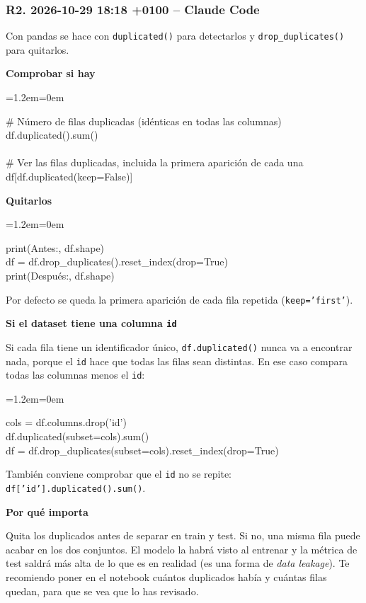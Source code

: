 \documentclass[11pt,a4paper]{article}
\newenvironment{codigo}
  {\par\smallskip\begin{list}{}{\leftmargin=1.2em\rightmargin=0em}\item\relax\ttfamily\scriptsize\raggedright}
  {\end{list}\smallskip}
\begin{document}
\subsubsection*{R2. 2026-10-29 18:18 +0100 -- Claude Code}
{\small
Con pandas se hace con \texttt{duplicated()} para detectarlos y \texttt{drop\_\allowbreak{}duplicates()} para quitarlos.

\textbf{Comprobar si hay}

\begin{codigo}
\# Número de filas duplicadas (idénticas en todas las columnas) \\{}
df.duplicated().sum() \\{}
\mbox{} \\{}
\# Ver las filas duplicadas, incluida la primera aparición de cada una \\{}
df[df.duplicated(keep=False)]
\end{codigo}
\textbf{Quitarlos}

\begin{codigo}
print(\textquotedbl{}Antes:\textquotedbl{}, df.shape) \\{}
df = df.drop\_\allowbreak{}duplicates().reset\_\allowbreak{}index(drop=True) \\{}
print(\textquotedbl{}Después:\textquotedbl{}, df.shape)
\end{codigo}
Por defecto se queda la primera aparición de cada fila repetida (\texttt{keep='first'}).

\textbf{Si el dataset tiene una columna \texttt{id}}

Si cada fila tiene un identificador único, \texttt{df.duplicated()} nunca va a encontrar nada, porque el \texttt{id} hace que todas las filas sean distintas. En ese caso compara todas las columnas menos el \texttt{id}:

\begin{codigo}
cols = df.columns.drop('id') \\{}
df.duplicated(subset=cols).sum() \\{}
df = df.drop\_\allowbreak{}duplicates(subset=cols).reset\_\allowbreak{}index(drop=True)
\end{codigo}
También conviene comprobar que el \texttt{id} no se repite: \texttt{df['id'].duplicated().sum()}.

\textbf{Por qué importa}

Quita los duplicados antes de separar en train y test. Si no, una misma fila puede acabar en los dos conjuntos. El modelo la habrá \textquotedbl{}visto\textquotedbl{} al entrenar y la métrica de test saldrá más alta de lo que es en realidad (es una forma de \textit{data leakage}). Te recomiendo poner en el notebook cuántos duplicados había y cuántas filas quedan, para que se vea que lo has revisado.

}
\end{document}

